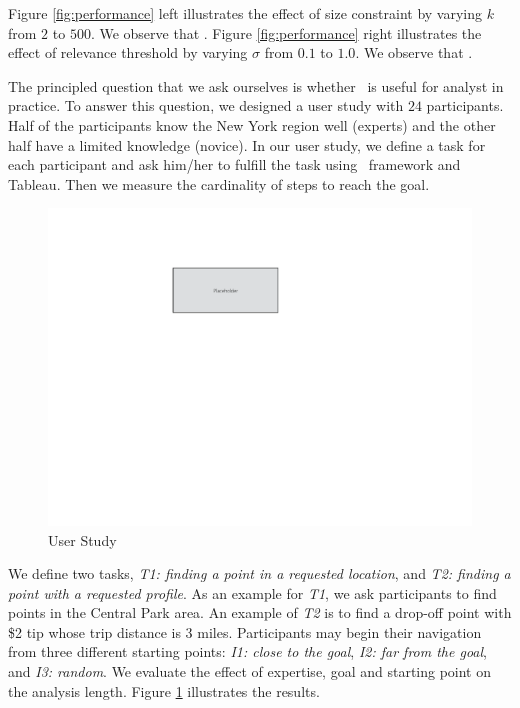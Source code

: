 Figure \ref{fig:performance} left illustrates the effect of size constraint by varying $k$ from $2$ to $500$. We observe that . Figure \ref{fig:performance} right illustrates the effect of relevance threshold by varying $\sigma$ from $0.1$ to $1.0$. We observe that .

\vspace{5pt}
The principled question that we ask ourselves is whether \framework\ is useful for analyst in practice. To answer this question, we designed a user study with $24$ participants. Half of the participants know the New York region well (experts) and the other half have a limited knowledge (novice). In our user study, we define a task for each participant and ask him/her to fulfill the task using \framework\ framework and {\sc Tableau}. Then we measure the cardinality of steps to reach the goal.

\begin{figure}
  \centering
  \includegraphics[width=\columnwidth]{figs/placeholder}
\caption{User Study}
\label{fig:userstudy}
\end{figure}

We define two tasks, {\em T1: finding a point in a requested location}, and {\em T2: finding a point with a requested profile}. As an example for {\em T1}, we ask participants to find points in the Central Park area. An example of {\em T2} is to find a drop-off point with \$2 tip whose trip distance is 3 miles. Participants may begin their navigation from three different starting points: {\em I1: close to the goal}, {\em I2: far from the goal}, and {\em I3: random}. We evaluate the effect of expertise, goal and starting point on the analysis length. Figure \ref{fig:userstudy} illustrates the results.

